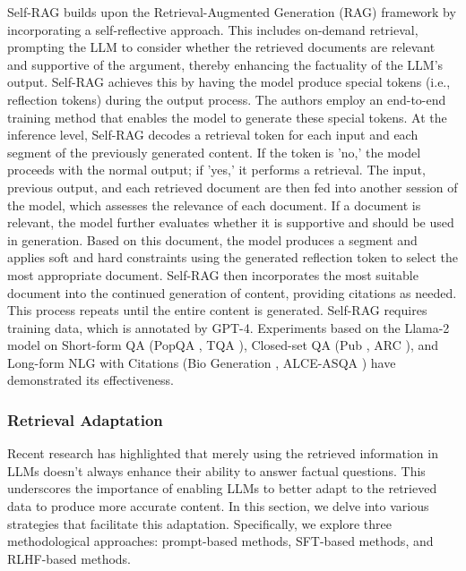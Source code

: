 Self-RAG \citep{asai2023selfrag} builds upon the Retrieval-Augmented Generation (RAG) framework by incorporating a self-reflective approach. This includes on-demand retrieval, prompting the LLM to consider whether the retrieved documents are relevant and supportive of the argument, thereby enhancing the factuality of the LLM's output. Self-RAG achieves this by having the model produce special tokens (i.e., reflection tokens) during the output process. The authors employ an end-to-end training method that enables the model to generate these special tokens. At the inference level, Self-RAG decodes a retrieval token for each input and each segment of the previously generated content. If the token is 'no,' the model proceeds with the normal output; if 'yes,' it performs a retrieval. The input, previous output, and each retrieved document are then fed into another session of the model, which assesses the relevance of each document. If a document is relevant, the model further evaluates whether it is supportive and should be used in generation. Based on this document, the model produces a segment and applies soft and hard constraints using the generated reflection token to select the most appropriate document. Self-RAG then incorporates the most suitable document into the continued generation of content, providing citations as needed. This process repeats until the entire content is generated. Self-RAG requires training data, which is annotated by GPT-4. Experiments based on the Llama-2 model on Short-form QA (PopQA \citep{PopQA}, TQA \citep{TQ}), Closed-set QA (Pub \citep{zhang2023interpretable}, ARC \citep{clark2018think}), and Long-form NLG with Citations (Bio Generation \citep{Min2023-FActScore}, ALCE-ASQA \citep{gao2023enabling}) have demonstrated its effectiveness.

\subsubsection{Retrieval Adaptation}
\label{sec:enhace_rag_adapt}

Recent research \citep{wang2023evaluating,ren2023investigating} has highlighted that merely using the retrieved information in LLMs doesn't always enhance their ability to answer factual questions. This underscores the importance of enabling LLMs to better adapt to the retrieved data to produce more accurate content. In this section, we delve into various strategies that facilitate this adaptation. Specifically, we explore three methodological approaches: prompt-based methods, SFT-based methods, and RLHF-based methods.

